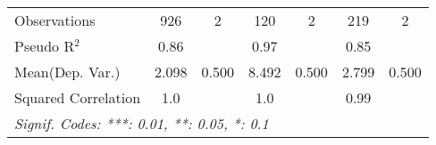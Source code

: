 \begin{tabular}{lcccccc}
   Observations                                               & 926           & 2    & 120            & 2    & 219           & 2\\  
   Pseudo R$^2$                                               & 0.86          &      & 0.97           &      & 0.85          & \\  
Mean(Dep. Var.) & 2.098 & 0.500 & 8.492 & 0.500 & 2.799 & 0.500 \\
   Squared Correlation                                        & 1.0           &      & 1.0            &      & 0.99          & \\  
   \midrule \midrule
   \multicolumn{7}{l}{\emph{Signif. Codes: ***: 0.01, **: 0.05, *: 0.1}}\\
\end{tabular}
\par\endgroup
